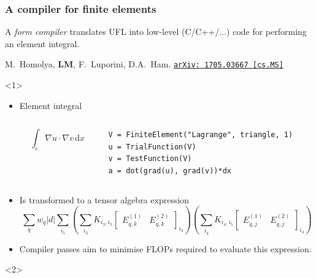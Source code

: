 \documentclass[presentation]{beamer}
\newcommand{\arxivlink}[2]{%
  \href{http://www.arxiv.org/abs/#1}%
  {\texttt{arXiv:\,#1\,[#2]}}%
}
\begin{document}
\begin{frame}[fragile]
  \frametitle{A compiler for finite elements}
  A \emph{form compiler} translates UFL into
  low-level (C/C++/...) code for performing an element integral.
  \begin{flushright}
    {\scriptsize M.~Homolya, \textbf{LM}, F.~Luporini, D.A.~Ham. \arxivlink{1705.03667}{cs.MS}}
  \end{flushright}
  \begin{overlayarea}{\textwidth}{0.8\textheight}
  \begin{onlyenv}<1> 
    \begin{itemize}
    \item Element integral
      \begin{columns}
        \begin{column}{0.4\textwidth}
          \begin{equation*}
            \int_e \nabla u \cdot \nabla v\,\text{d}x
          \end{equation*}
        \end{column}
        \hspace{-3em}
        \begin{column}{0.6\textwidth}
\begin{verbatim}
V = FiniteElement("Lagrange", triangle, 1)
u = TrialFunction(V)
v = TestFunction(V)
a = dot(grad(u), grad(v))*dx
\end{verbatim}
        \end{column}
      \end{columns}
    \item Is transformed to a tensor algebra expression
      {\small \begin{equation*}
    \sum_q w_q \left| d \right| \sum_{i_5} \left( \sum_{i_3}
      K_{i_3,i_5} \begin{bmatrix}
        E^{(1)}_{q,k} & E^{(2)}_{q,k}
      \end{bmatrix}_{i_3} \right)
    \left( \sum_{i_4} K_{i_4,i_5} \begin{bmatrix}
        E^{(1)}_{q,j} & E^{(2)}_{q,j}
      \end{bmatrix}_{i_4} \right)
  \end{equation*}}
    \item Compiler passes aim to minimise FLOPs required to evaluate
      this expression.
    \end{itemize}
  \end{onlyenv}
  \begin{onlyenv}<2>
    \begin{columns}

\end{columns}
\end{onlyenv}
\end{overlayarea}
\end{frame}
\end{document}
